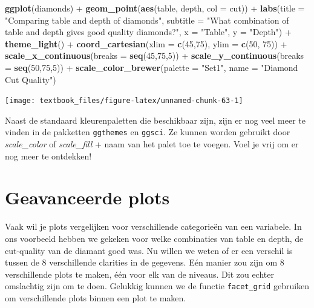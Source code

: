 \documentclass[]{tufte-book}
\newenvironment{Shaded}{}{}
\newcommand{\DataTypeTok}[1]{\textcolor[rgb]{0.56,0.13,0.00}{#1}}
\newcommand{\DecValTok}[1]{\textcolor[rgb]{0.25,0.63,0.44}{#1}}
\newcommand{\KeywordTok}[1]{\textcolor[rgb]{0.00,0.44,0.13}{\textbf{#1}}}
\newcommand{\NormalTok}[1]{#1}
\newcommand{\OperatorTok}[1]{\textcolor[rgb]{0.40,0.40,0.40}{#1}}
\newcommand{\StringTok}[1]{\textcolor[rgb]{0.25,0.44,0.63}{#1}}
\begin{document}
\begin{Shaded}
\begin{Highlighting}[]
\KeywordTok{ggplot}\NormalTok{(diamonds) }\OperatorTok{+}
\StringTok{    }\KeywordTok{geom_point}\NormalTok{(}\KeywordTok{aes}\NormalTok{(table, depth, }\DataTypeTok{col =}\NormalTok{ cut)) }\OperatorTok{+}\StringTok{ }
\StringTok{    }\KeywordTok{labs}\NormalTok{(}\DataTypeTok{title =} \StringTok{"Comparing table and depth of diamonds"}\NormalTok{,}
         \DataTypeTok{subtitle =} \StringTok{"What combination of table and depth gives good quality diamonds?"}\NormalTok{,}
         \DataTypeTok{x =} \StringTok{"Table"}\NormalTok{,}
         \DataTypeTok{y =} \StringTok{"Depth"}\NormalTok{) }\OperatorTok{+}
\StringTok{    }\KeywordTok{theme_light}\NormalTok{() }\OperatorTok{+}
\StringTok{    }\KeywordTok{coord_cartesian}\NormalTok{(}\DataTypeTok{xlim =} \KeywordTok{c}\NormalTok{(}\DecValTok{45}\NormalTok{,}\DecValTok{75}\NormalTok{), }\DataTypeTok{ylim =} \KeywordTok{c}\NormalTok{(}\DecValTok{50}\NormalTok{, }\DecValTok{75}\NormalTok{)) }\OperatorTok{+}
\StringTok{    }\KeywordTok{scale_x_continuous}\NormalTok{(}\DataTypeTok{breaks =} \KeywordTok{seq}\NormalTok{(}\DecValTok{45}\NormalTok{,}\DecValTok{75}\NormalTok{,}\DecValTok{5}\NormalTok{)) }\OperatorTok{+}
\StringTok{    }\KeywordTok{scale_y_continuous}\NormalTok{(}\DataTypeTok{breaks =} \KeywordTok{seq}\NormalTok{(}\DecValTok{50}\NormalTok{,}\DecValTok{75}\NormalTok{,}\DecValTok{5}\NormalTok{)) }\OperatorTok{+}
\StringTok{    }\KeywordTok{scale_color_brewer}\NormalTok{(}\DataTypeTok{palette =} \StringTok{"Set1"}\NormalTok{, }\DataTypeTok{name =} \StringTok{"Diamond Cut Quality"}\NormalTok{)}
\end{Highlighting}
\end{Shaded}

\texttt{[image: textbook\_files/figure-latex/unnamed-chunk-63-1]}

Naast de standaard kleurenpaletten die beschikbaar zijn, zijn er nog veel meer te vinden in de pakketten \texttt{ggthemes} en \texttt{ggsci}. Ze kunnen worden gebruikt door \emph{scale\_color} of \emph{scale\_fill} + naam van het palet toe te voegen. Voel je vrij om er nog meer te ontdekken!

\hypertarget{geavanceerde-plots}{%
\section{Geavanceerde plots}\label{geavanceerde-plots}}

Vaak wil je plots vergelijken voor verschillende categorieën van een variabele. In ons voorbeeld hebben we gekeken voor welke combinaties van table en depth, de cut-quality van de diamant goed was. Nu willen we weten of er een verschil is tussen de 8 verschillende clarities in de gegevens. Eén manier zou zijn om 8 verschillende plots te maken, één voor elk van de niveaus. Dit zou echter omslachtig zijn om te doen. Gelukkig kunnen we de functie \texttt{facet\_grid} gebruiken om verschillende plots binnen een plot te maken.
\end{document}
